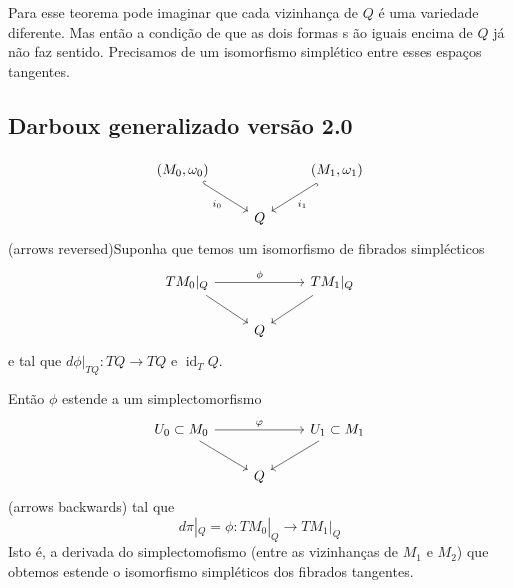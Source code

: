 Para esse teorema pode imaginar que cada vizinhança de $Q$ \'e uma variedade diferente. Mas ent\~ao a condi\c c\~ao de que as dois formas s \~ao iguais encima de $Q$ j\'a n\~ao faz sentido. Precisamos de um isomorfismo simpl\'etico entre esses espaços tangentes.

\subsection{Darboux generalizado vers\~ao 2.0}

\begin{thm}\leavevmode
	\[\begin{tikzcd}
		(M_0,\omega_0)\arrow[dr,"i_0",swap,hook]&&(M_1,\omega_1)\arrow[dl,"i_1",hook]\\
	&Q
	\end{tikzcd}\]
	(arrows reversed)Suponha que temos um isomorfismo de fibrados simpl\'ecticos
	\[\begin{tikzcd}
	TM_0|_{Q}\arrow[rr,"\phi"]\arrow[dr,swap]&&TM_1|_{Q}\arrow[dl]\\
	&Q
	\end{tikzcd}\]
	e tal que $d\phi|_{TQ}:TQ\to TQ$ e $\operatorname{id}_TQ$.

	Ent\~ao $\phi$ estende a um simplectomorfismo
	\[\begin{tikzcd}
	U_0\subset M_0\arrow[rr,"\varphi"]\arrow[dr,swap]&&U_1\subset M_1\arrow[dl]\\
	&Q
	\end{tikzcd}\]
	(arrows backwards) tal que
	\[d\pi|_{Q}=\phi:TM_0|_{Q}\to TM_1|_{Q}\]
	Isto \'e, a derivada do simplectomofismo (entre as vizinhanças de $M_1$ e $M_2$) que obtemos estende o isomorfismo simpl\'eticos dos fibrados tangentes.
\end{thm}

